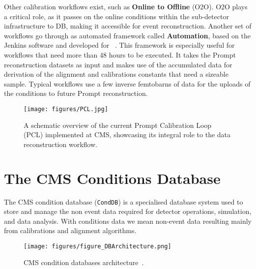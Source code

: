 Other calibration workflows exist, such as \textbf{Online to Offline} (O2O). O2O plays a critical role, as it passes on the online conditions within the sub-detector infrastructure to DB, making it accessible for event reconstruction.
Another set of workflows go through as automated framework called \textbf{Automation},
based on the Jenkins software and developed for \Runthree~\cite{Pigazzini:2853679}.
This framework is especially useful for workflows that need more than 48 hours to be executed.
It takes the Prompt reconstruction datasets as input and makes use of the accumulated data for derivation of the alignment and calibrations constants that need a sizeable sample. Typical workflows use a few inverse femtobarns of data for the uploads of the conditions to future Prompt reconstruction.

\begin{figure}[h!]	
\centering
\texttt{[image: figures/PCL.jpg]} %
\caption{A schematic overview of the current Prompt Calibration Loop (PCL) implemented at CMS, showcasing its integral role to the data reconstruction workflow.} %
\label{fig:PCL}
\end{figure}


\section{The CMS Conditions Database} \label{sec:CMS_CondDB}

The CMS condition database (\texttt{CondDB}) is a specialised database system used to store and manage the non event data required for detector operations, simulation, and data analysis. With conditions data we mean non-event data resulting mainly from calibrations and alignment algorithms.

\begin{figure}[h!]	
\centering
\texttt{[image: figures/figure\_DBArchitecture.png]} %
\caption{CMS condition databases architecture~\cite{DeGruttola:2010gb}.}
\label{fig:CondDB}
\end{figure}

